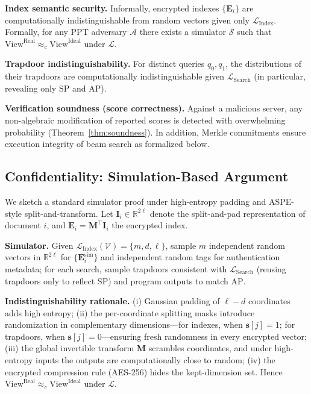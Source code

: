 \documentclass[journal]{IEEEtran}
\begin{document}
\textbf{Index semantic security.} Informally, encrypted indexes $\{\mathbf{E}_i\}$ are computationally indistinguishable from random vectors given only $\mathcal{L}_{\mathrm{Index}}$. Formally, for any PPT adversary $\mathcal{A}$ there exists a simulator $\mathcal{S}$ such that $\mathrm{View}^{\mathrm{Real}}\approx_c\mathrm{View}^{\mathrm{Ideal}}$ under $\mathcal{L}$.

\textbf{Trapdoor indistinguishability.} For distinct queries $q_0,q_1$, the distributions of their trapdoors are computationally indistinguishable given $\mathcal{L}_{\mathrm{Search}}$ (in particular, revealing only $\mathrm{SP}$ and $\mathrm{AP}$).

\textbf{Verification soundness (score correctness).} Against a malicious server, any non-algebraic modification of reported scores is detected with overwhelming probability (Theorem~\ref{thm:soundness}). In addition, Merkle commitments ensure execution integrity of beam search as formalized below.

\subsection{Confidentiality: Simulation-Based Argument}
\label{subsec:confidentiality}

We sketch a standard simulator proof under high-entropy padding and ASPE-style split-and-transform. Let $\mathbf{I}_i\in\mathbb{R}^{2\ell}$ denote the split-and-pad representation of document $i$, and $\mathbf{E}_i=\mathbf{M}^{\top}\mathbf{I}_i$ the encrypted index.

\textbf{Simulator.} Given $\mathcal{L}_{\mathrm{Index}}(\mathcal{V})=\{m,d,\ell\}$, sample $m$ independent random vectors in $\mathbb{R}^{2\ell}$ for $\{\mathbf{E}_i^{\mathrm{sim}}\}$ and independent random tags for authentication metadata; for each search, sample trapdoors consistent with $\mathcal{L}_{\mathrm{Search}}$ (reusing trapdoors only to reflect $\mathrm{SP}$) and program outputs to match $\mathrm{AP}$.

\textbf{Indistinguishability rationale.} (i) Gaussian padding of $\ell{-}d$ coordinates adds high entropy; (ii) the per-coordinate splitting masks introduce randomization in complementary dimensions—for indexes, when $\mathbf{s}[j]=1$; for trapdoors, when $\mathbf{s}[j]=0$—ensuring fresh randomness in every encrypted vector; (iii) the global invertible transform $\mathbf{M}$ scrambles coordinates, and under high-entropy inputs the outputs are computationally close to random; (iv) the encrypted compression rule (AES-256) hides the kept-dimension set. Hence $\mathrm{View}^{\mathrm{Real}}\approx_c\mathrm{View}^{\mathrm{Ideal}}$ under $\mathcal{L}$.
\end{document}
